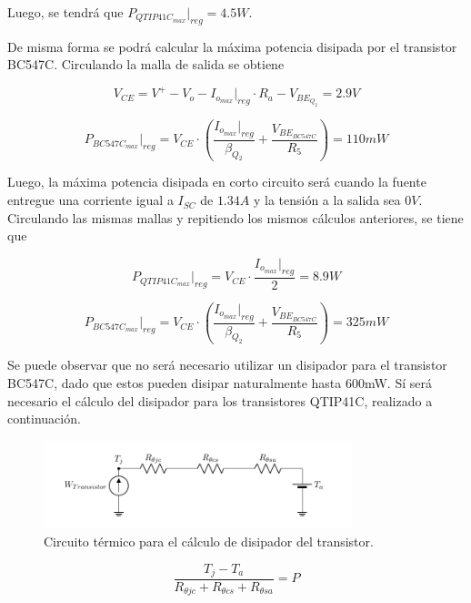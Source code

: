 Luego, se tendrá que $P_{QTIP41C_{max}}|_{reg} = 4.5W$.

De misma forma se podrá calcular la máxima potencia disipada por el transistor BC547C. Circulando la malla de salida se obtiene

\begin{equation}
V_{CE} = V^+ - V_o - I_{o_{max}}|_{reg} \cdot R_a - V_{BE_{Q_2}} = 2.9V
\end{equation}

\begin{equation}
P_{BC547C_{max}}|_{reg} = V_{CE} \cdot \left(\frac{I_{o_{max}}|_{reg}}{\beta_{Q_2}} + \frac{V_{BE_{BC547C}}}{R_5} \right) = 110mW
\end{equation}

Luego, la máxima potencia disipada en corto circuito será cuando la fuente entregue una corriente igual a $I_{SC}$ de $1.34A$ y la tensión a la salida sea $0V$. Circulando las mismas mallas y repitiendo los mismos cálculos anteriores, se tiene que

\begin{equation}
P_{QTIP41C_{max}}|_{reg} = V_{CE}\cdot \frac{I_{o_{max}}|_{reg}}{2} = 8.9W
\end{equation}

\begin{equation}
P_{BC547C_{max}}|_{reg} = V_{CE} \cdot \left(\frac{I_{o_{max}}|_{reg}}{\beta_{Q_2}} + \frac{V_{BE_{BC547C}}}{R_5} \right) = 325mW
\end{equation}

Se puede observar que no será necesario utilizar un disipador para el transistor BC547C, dado que estos pueden disipar naturalmente hasta 600mW. Sí será necesario el cálculo del disipador para los transistores QTIP41C, realizado a continuación.

\begin{figure}[H]
\centering
	\includegraphics[width=0.8\textwidth, page=1]{ImagenesEjercicio2/Potencia.pdf}
	\caption{Circuito térmico para el cálculo de disipador del transistor.}
	\label{fig:circuitopottrans}
\end{figure}

\begin{equation}
\frac{T_j - T_a}{R_{\theta jc}+R_{\theta cs}+R_{\theta sa}} = P
\end{equation}

